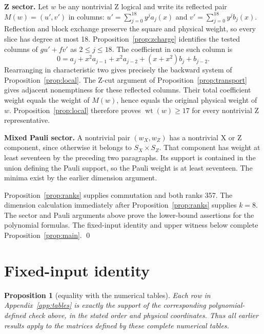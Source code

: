 \documentclass{article}
\newtheorem{proposition}{Proposition}
\DeclareMathOperator{\wt}{wt}
\begin{document}
\textbf{Z sector.} Let \(w\) be any nontrivial Z logical and write its reflected pair
\(M(w) = (u', v')\) in columns: \(u' = \sum_{j=0}^{18} y^j a_j(x)\) and
\(v' = \sum_{j=0}^{18} y^j b_j(x)\). Reflection and block exchange preserve the square and
physical weight, so every slice has degree at most 18. Proposition~\ref{prop:zcharge} identifies
the tested columns of \(gu' + fv'\) as \(2 \le j \le 18\). The coefficient in one such column is
\begin{equation}
  0 = a_j + x^2 a_{j-1} + x^2 a_{j-2} + (x + x^2) b_j + b_{j-2}.
\end{equation}
Rearranging in characteristic two gives precisely the backward system of
Proposition~\ref{prop:local}. The Z-cut argument of Proposition~\ref{prop:transport} gives
adjacent nonemptiness for these reflected columns. Their total coefficient weight equals the
weight of \(M(w)\), hence equals the original physical weight of \(w\).
Proposition~\ref{prop:local} therefore proves \(\wt(w) \ge 17\) for every nontrivial Z
representative.

\textbf{Mixed Pauli sector.} A nontrivial pair \((w_X, w_Z)\) has a nontrivial X or Z component,
since otherwise it belongs to \(S_X \times S_Z\). That component has weight at least seventeen by
the preceding two paragraphs. Its support is contained in the union defining the Pauli support,
so the Pauli weight is at least seventeen. The minima exist by the earlier dimension argument.

Proposition~\ref{prop:ranks} supplies commutation and both ranks 357. The dimension calculation
immediately after Proposition~\ref{prop:ranks} supplies \(k = 8\). The sector and Pauli arguments
above prove the lower-bound assertions for the polynomial formulas. The fixed-input identity and
upper witness below complete Proposition~\ref{prop:main}. \qed

\section{Fixed-input identity}\label{sec:tables}

\begin{proposition}[equality with the numerical tables]\label{prop:tables}
  Each row in Appendix~\ref{app:tables} is exactly the support of the corresponding
  polynomial-defined check above, in the stated order and physical coordinates. Thus all earlier
  results apply to the matrices defined by these complete numerical tables.
\end{proposition}
\end{document}
